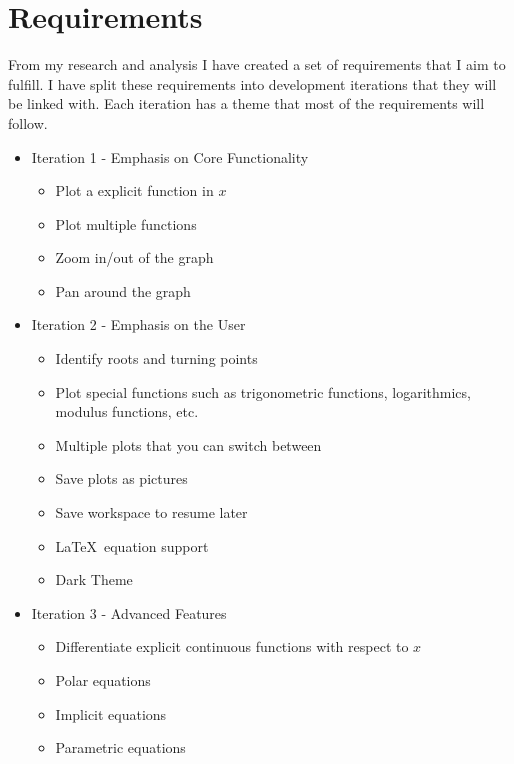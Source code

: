 \documentclass[../../../main.tex]{subfiles}
\begin{document}
\chapter{Requirements}
From my research and analysis I have created a set of requirements that I aim to fulfill. I have split these requirements into development iterations that they will be linked with. Each iteration has a theme that most of the requirements will follow.
\begin{itemize}
	\item Iteration 1 - Emphasis on Core Functionality
		\begin{itemize}
			\item Plot a explicit function in $x$
			\item Plot multiple functions
			\item Zoom in/out of the graph
			\item Pan around the graph
		\end{itemize}
	\item Iteration 2 - Emphasis on the User
		\begin{itemize}
			\item Identify roots and turning points 
			\item Plot special functions such as trigonometric functions, logarithmics, modulus functions, etc.
			\item Multiple plots that you can switch between
			\item Save plots as pictures
			\item Save workspace to resume later
			\item \LaTeX \ equation support
			\item Dark Theme
		\end{itemize}
	\item Iteration 3 - Advanced Features
		\begin{itemize}
			\item Differentiate explicit continuous functions with respect to $x$
			\item Polar equations
			\item Implicit equations
			\item Parametric equations
		\end{itemize}
\end{itemize}
\end{document}
